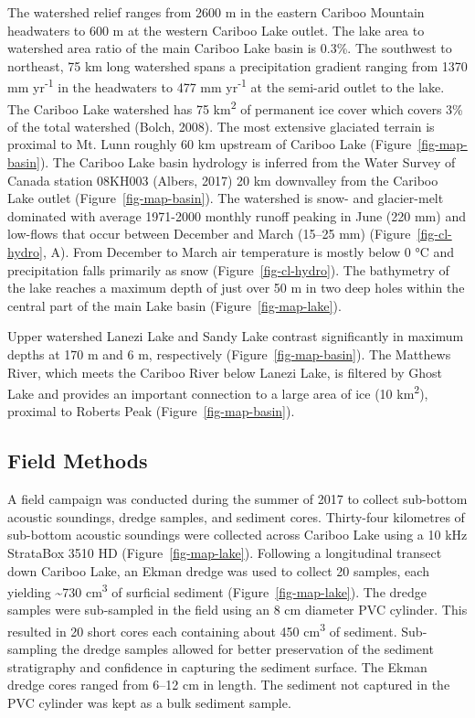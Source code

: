 \documentclass[
  letterpaper,
  DIV=11,
  numbers=noendperiod]{scrartcl}
\begin{document}
The watershed relief ranges from 2600 m in the eastern Cariboo Mountain
headwaters to 600 m at the western Cariboo Lake outlet. The lake area to
watershed area ratio of the main Cariboo Lake basin is 0.3\%. The
southwest to northeast, 75 km long watershed spans a precipitation
gradient ranging from 1370 mm yr\textsuperscript{-1} in the headwaters
to 477 mm yr\textsuperscript{-1} at the semi-arid outlet to the lake.
The Cariboo Lake watershed has 75 km\textsuperscript{2} of permanent ice
cover which covers 3\% of the total watershed (Bolch, 2008). The most
extensive glaciated terrain is proximal to Mt. Lunn roughly 60 km
upstream of Cariboo Lake (Figure~\ref{fig-map-basin}). The Cariboo Lake
basin hydrology is inferred from the Water Survey of Canada station
08KH003 (Albers, 2017) 20 km downvalley from the Cariboo Lake outlet
(Figure~\ref{fig-map-basin}). The watershed is snow- and glacier-melt
dominated with average 1971-2000 monthly runoff peaking in June (220 mm)
and low-flows that occur between December and March (15--25 mm)
(Figure~\ref{fig-cl-hydro}, A). From December to March air temperature
is mostly below 0 °C and precipitation falls primarily as snow
(Figure~\ref{fig-cl-hydro}). The bathymetry of the lake reaches a
maximum depth of just over 50 m in two deep holes within the central
part of the main Lake basin (Figure~\ref{fig-map-lake}).

Upper watershed Lanezi Lake and Sandy Lake contrast significantly in
maximum depths at 170 m and 6 m, respectively
(Figure~\ref{fig-map-basin}). The Matthews River, which meets the
Cariboo River below Lanezi Lake, is filtered by Ghost Lake and provides
an important connection to a large area of ice (10
km\textsuperscript{2}), proximal to Roberts Peak
(Figure~\ref{fig-map-basin}).

\hypertarget{field-methods}{%
\subsection{Field Methods}\label{field-methods}}

A field campaign was conducted during the summer of 2017 to collect
sub-bottom acoustic soundings, dredge samples, and sediment cores.
Thirty-four kilometres of sub-bottom acoustic soundings were collected
across Cariboo Lake using a 10 kHz StrataBox 3510 HD
(Figure~\ref{fig-map-lake}). Following a longitudinal transect down
Cariboo Lake, an Ekman dredge was used to collect 20 samples, each
yielding \textasciitilde730 cm\textsuperscript{3} of surficial sediment
(Figure~\ref{fig-map-lake}). The dredge samples were sub-sampled in the
field using an 8 cm diameter PVC cylinder. This resulted in 20 short
cores each containing about 450 cm\textsuperscript{3} of sediment.
Sub-sampling the dredge samples allowed for better preservation of the
sediment stratigraphy and confidence in capturing the sediment surface.
The Ekman dredge cores ranged from 6--12 cm in length. The sediment not
captured in the PVC cylinder was kept as a bulk sediment sample.
\end{document}
